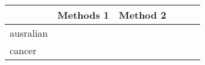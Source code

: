 \begin{tabular}{ l | C{\tblw}  | C{\tblw} | C{\tblw} | C{\tblw} | C{\tblw} }
\toprule
  & Methods 1 & Method 2 \\
\midrule
\sc ausralian &  \\
\sc cancer &  \\
\bottomrule 
\end{tabular}